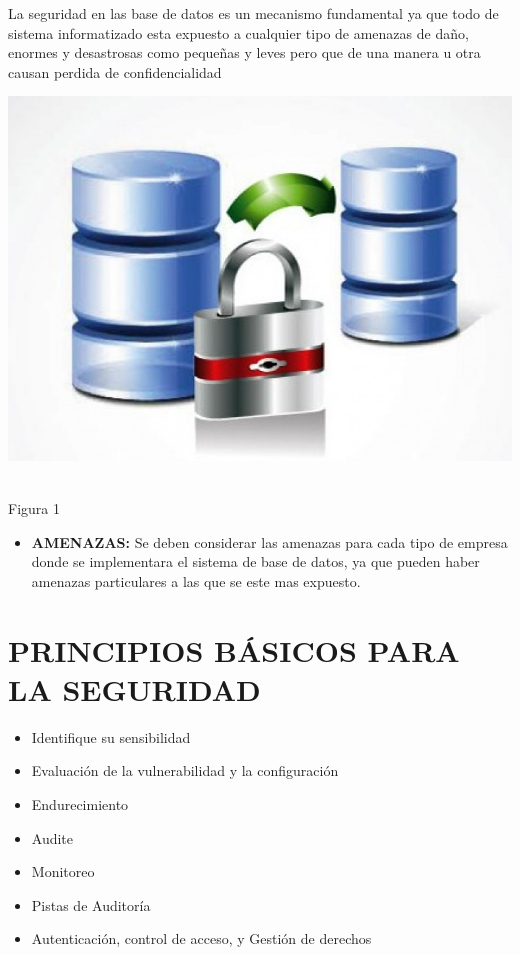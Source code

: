 \documentclass[conference]{IEEEtran}
\begin{document}
La seguridad en las base de datos es un mecanismo fundamental ya que todo de sistema informatizado esta expuesto a cualquier tipo de amenazas de daño, enormes y desastrosas como pequeñas y leves pero que de una manera u otra causan perdida de confidencialidad
\\
\begin{flushright}
  \includegraphics[scale=0.31]{Imagenes/seguridadbd.jpg}
\end{flushright}
\centering
\\Figura 1
\\

\begin{itemize}
\item \textbf{AMENAZAS:} Se deben considerar las amenazas para cada tipo de empresa donde se implementara el sistema de base de datos, ya que pueden haber amenazas particulares a las que se este mas expuesto.
\end{itemize}

\section{PRINCIPIOS BÁSICOS PARA LA SEGURIDAD}

\begin{itemize}
\item \textbf{}Identifique su sensibilidad 
\item \textbf{}Evaluación de la vulnerabilidad y la configuración 
\item \textbf{}Endurecimiento 
\item \textbf{}Audite 
\item \textbf{}Monitoreo 
\item \textbf{}Pistas de Auditoría 
\item \textbf{}Autenticación, control de acceso, y Gestión de derechos
\end{itemize}
\end{document}
